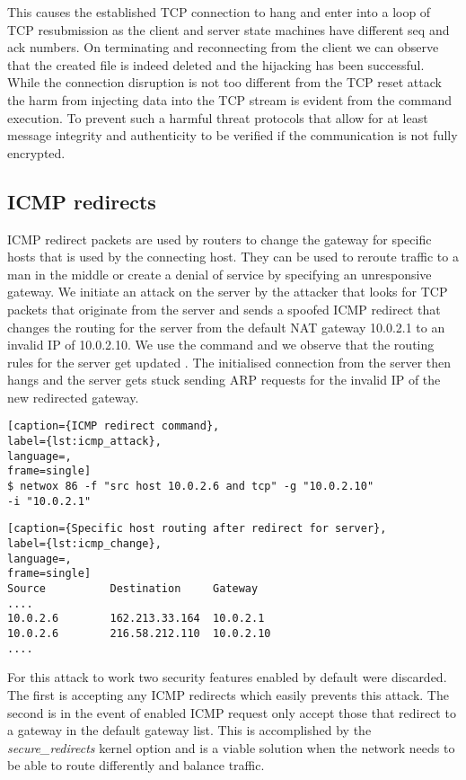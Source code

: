 This causes the established TCP connection to hang and enter into a loop of TCP resubmission as the client and server state machines have different seq and ack numbers. On terminating and reconnecting from the client we can observe that the created file is indeed deleted and the hijacking has been successful. While the connection disruption is not too different from the TCP reset attack the harm from injecting data into the TCP stream is evident from the command execution. To prevent such a harmful threat protocols that allow for at least message integrity and authenticity to be verified if the communication is not fully encrypted.

\subsection{ICMP redirects}
ICMP redirect packets are used by routers to change the gateway for specific hosts that is used by the connecting host. They can be used to reroute traffic to a man in the middle or create a denial of service by specifying an unresponsive gateway. We initiate an attack on the server by the attacker that looks for TCP packets that originate from the server and sends a spoofed ICMP redirect that changes the routing for the server from the default NAT gateway 10.0.2.1 to an invalid IP of 10.0.2.10. We use the command  and we observe that the routing rules for the server get updated . The initialised connection from the server then hangs and the server gets stuck sending ARP requests for the invalid IP of the new redirected gateway.

\begin{minipage}{\linewidth}
\begin{lstlisting}[caption={ICMP redirect command},
label={lst:icmp_attack},
language=,
frame=single]
$ netwox 86 -f "src host 10.0.2.6 and tcp" -g "10.0.2.10" 
-i "10.0.2.1"
\end{lstlisting}
\end{minipage}

\begin{minipage}{\linewidth}
\begin{lstlisting}[caption={Specific host routing after redirect for server},
label={lst:icmp_change},
language=,
frame=single]
Source          Destination     Gateway
....
10.0.2.6        162.213.33.164  10.0.2.1      
10.0.2.6        216.58.212.110  10.0.2.10     
....
\end{lstlisting}
\end{minipage}
For this attack to work two security features enabled by default were discarded. The first is accepting any ICMP redirects which easily prevents this attack. The second is in the event of enabled ICMP request only accept those that redirect to a gateway in the default gateway list. This is accomplished by the \emph{secure\_redirects} kernel option and is a viable solution when the network needs to be able to route differently and balance traffic.
